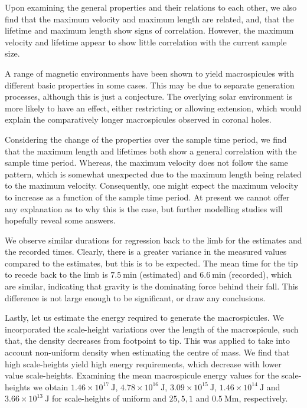 Upon examining the general properties and their relations to each other, we also find that the maximum velocity and maximum length are related, and, that the lifetime and maximum length show signs of correlation. However, the maximum velocity and lifetime appear to show little correlation with the current sample size.

A range of magnetic environments have been shown to yield macrospicules with different basic properties in some cases. This may be due to separate generation processes, although this is just a conjecture. The overlying solar environment is more likely to have an effect, either restricting or allowing extension, which would explain the comparatively longer macrospicules observed in coronal holes.

Considering the change of the properties over the sample time period, we find that the maximum length and lifetimes both show a general correlation with the sample time period. Whereas, the maximum velocity does not follow the same pattern, which is somewhat unexpected due to the maximum length being related to the maximum velocity. Consequently, one might expect the maximum velocity to increase as a function of the sample time period. At present we cannot offer any explanation as to why this is the case, but further modelling studies will hopefully reveal some answers.

We observe similar durations for regression back to the limb for the estimates and the recorded times. Clearly, there is a greater variance in the measured values compared to the estimates, but this is to be expected. The mean time for the tip to recede back to the limb is $7.5\ \textrm{min}$ (estimated) and $6.6\ \textrm{min}$ (recorded), which are similar, indicating that gravity is the dominating force behind their fall. This difference is not large enough to be significant, or draw any conclusions.

Lastly, let us estimate the energy required to generate the macrospicules. We incorporated the scale-height variations over the length of the macrospicule, such that, the density decreases from footpoint to tip. This was applied to take into account non-uniform density when estimating the centre of mass. We find that high scale-heights yield high energy requirements, which decrease with lower value scale-heights. Examining the mean macrospicule energy values for the scale-heights we obtain $1.46 \times 10^{17}\ \textrm{J}$, $4.78 \times 10^{16}\ \textrm{J}$,  $3.09 \times 10^{15}\ \textrm{J}$, $1.46 \times 10^{14}\ \textrm{J}$ and $3.66 \times 10^{13}\ \textrm{J}$ for scale-heights of uniform and $25, 5, 1$ and $0.5\ \textrm{Mm}$, respectively.



